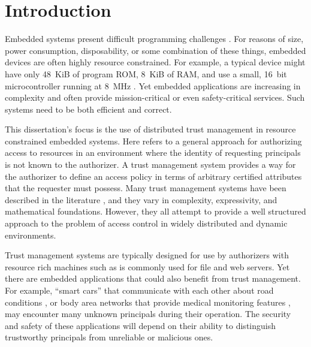 \chapter{Introduction}
\label{chapter-introduction}

Embedded systems present difficult programming challenges
\cite{Mottola:2011:PWS:1922649.1922656}. For reasons of size, power consumption, disposability,
or some combination of these things, embedded devices are often highly resource constrained. For
example, a typical device might have only 48~KiB of program ROM, 8~KiB of RAM, and use a small,
16~bit microcontroller running at 8~MHz \cite{tmotesky-datasheet}. Yet embedded applications are
increasing in complexity and often provide mission-critical or even safety-critical services.
Such systems need to be both efficient and correct.

This dissertation's focus is the use of distributed trust management in resource constrained
embedded systems. Here  refers to a general approach for authorizing
access to resources in an environment where the identity of requesting principals is not known
to the authorizer. A trust management system provides a way for the authorizer to define an
access policy in terms of arbitrary certified attributes that the requester must possess. Many
trust management systems have been described in the literature
\cite{chapin-skalka-wang-acmcs08}, and they vary in complexity, expressivity, and mathematical
foundations. However, they all attempt to provide a well structured approach to the problem of
access control in widely distributed and dynamic environments.

Trust management systems are typically designed for use by authorizers with resource rich
machines such as is commonly used for file and web servers. Yet there are embedded applications
that could also benefit from trust management. For example, ``smart cars'' that communicate with
each other about road conditions \cite{Seepold:2009:ESP:1641563.1641568}, or body area networks
that provide medical monitoring features
\cite{Shnayder:2005:SNM:1098918.1098979,Chen:2011:BAN:1968858.1968873}, may encounter many
unknown principals during their operation. The security and safety of these applications will
depend on their ability to distinguish trustworthy principals from unreliable or malicious ones.

